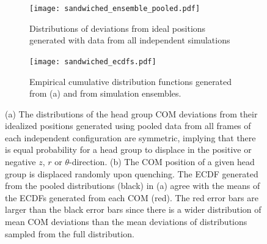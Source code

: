 \documentclass{article}
\begin{document}
  \begin{figure}[!htb]
  \centering
  \begin{subfigure}{\textwidth}
  \texttt{[image: sandwiched\_ensemble\_pooled.pdf]}
  \caption{Distributions of deviations from ideal positions generated with data
  from all independent simulations}\label{fig:offset_ensemble_pooled}
  \end{subfigure}
  \begin{subfigure}{\textwidth}
  \texttt{[image: sandwiched\_ecdfs.pdf]}
  \caption{Empirical cumulative distribution functions generated from (a) and
  from simulation ensembles.}\label{fig:offset_ecdfs}
  \end{subfigure}
  \caption{(a) The distributions of the head group COM deviations
  from their idealized positions generated using pooled data from all
  frames of each independent configuration are symmetric, implying that 
  there is equal probability for a head group to displace in the positive
  or negative $z$, $r$ or $\theta$-direction. (b) The COM position of a 
  given head group is displaced randomly upon quenching. The ECDF generated from
  the pooled distributions (black) in (a) agree with the means of the 
  ECDFs generated from each COM (red). The red error bars are larger than
  the black error bars since there is a wider distribution of mean COM
  deviations than the mean deviations of distributions sampled from the full
  distribution.}\label{fig:full_ensemble_distributions}
  \end{figure} 
\end{document}
